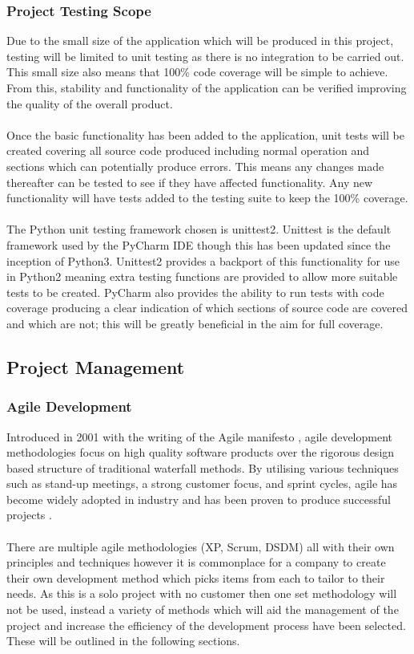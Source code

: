 	\subsubsection{Project Testing Scope}
		Due to the small size of the application which will be produced in this project, testing will be limited to unit testing as there is no integration to be carried out. This small size also means that 100\% code coverage will be simple to achieve. From this, stability and functionality of the application can be verified improving the quality of the overall product.
		\\\\
		Once the basic functionality has been added to the application, unit tests will be created covering all source code produced including normal operation and sections which can potentially produce errors. This means any changes made thereafter can be tested to see if they have affected functionality. Any new functionality will have tests added to the testing suite to keep the 100\% coverage.
		\\\\
		The Python unit testing framework chosen is unittest2. Unittest is the default framework used by the PyCharm IDE though this has been updated since the inception of Python3. Unittest2 provides a backport of this functionality for use in Python2 meaning extra testing functions are provided to allow more suitable tests to be created. PyCharm also provides the ability to run tests with code coverage producing a clear indication of which sections of source code are covered and which are not; this will be greatly beneficial in the aim for full coverage.
\subsection{Project Management}
	\subsubsection{Agile Development}
		Introduced in 2001 with the writing of the Agile manifesto \citep{beck2001manifesto}, agile development methodologies focus on high quality software products over the rigorous design based structure of traditional waterfall methods. By utilising various techniques such as stand-up meetings, a strong customer focus, and sprint cycles, agile has become widely adopted in industry and has been proven to produce successful projects \citep{state_of_agile_2015}.
		\\\\
		There are multiple agile methodologies (XP, Scrum, DSDM) all with their own principles and techniques however it is commonplace for a company to create their own development method which picks items from each to tailor to their needs. As this is a solo project with no customer then one set methodology will not be used, instead a variety of methods which will aid the management of the project and increase the efficiency of the development process have been selected. These will be outlined in the following sections.
